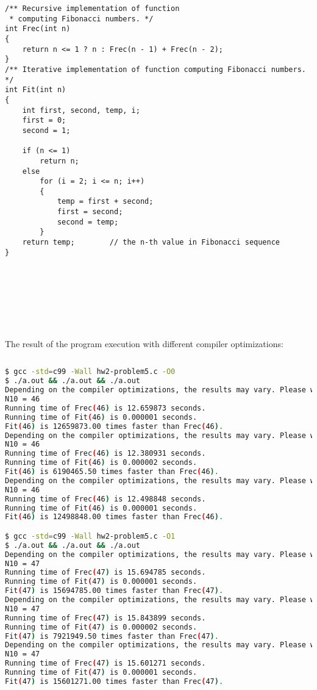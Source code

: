 \documentclass{article}
\begin{document}
\begin{verbatim}
/** Recursive implementation of function
 * computing Fibonacci numbers. */
int Frec(int n)
{
    return n <= 1 ? n : Frec(n - 1) + Frec(n - 2);
}
/** Iterative implementation of function computing Fibonacci numbers. */
int Fit(int n)
{
    int first, second, temp, i;
    first = 0;
    second = 1;

    if (n <= 1)
        return n;
    else
        for (i = 2; i <= n; i++)
        {
            temp = first + second;
            first = second;
            second = temp;
        }
    return temp;        // the n-th value in Fibonacci sequence
}
		\end{verbatim}
		
		
\paragraph{}\
\paragraph{}\
\paragraph{}\

	\rmfamily
	\noindent The result of the program execution with different compiler optimizations:
	
	\ttfamily
	\begin{lstlisting}[language=bash]
	
$ gcc -std=c99 -Wall hw2-problem5.c -O0
$ ./a.out && ./a.out && ./a.out
Depending on the compiler optimizations, the results may vary. Please wait...
N10 = 46
Running time of Frec(46) is 12.659873 seconds.
Running time of Fit(46) is 0.000001 seconds.
Fit(46) is 12659873.00 times faster than Frec(46).
Depending on the compiler optimizations, the results may vary. Please wait...
N10 = 46
Running time of Frec(46) is 12.380931 seconds.
Running time of Fit(46) is 0.000002 seconds.
Fit(46) is 6190465.50 times faster than Frec(46).
Depending on the compiler optimizations, the results may vary. Please wait...
N10 = 46
Running time of Frec(46) is 12.498848 seconds.
Running time of Fit(46) is 0.000001 seconds.
Fit(46) is 12498848.00 times faster than Frec(46).

$ gcc -std=c99 -Wall hw2-problem5.c -O1
$ ./a.out && ./a.out && ./a.out
Depending on the compiler optimizations, the results may vary. Please wait...
N10 = 47
Running time of Frec(47) is 15.694785 seconds.
Running time of Fit(47) is 0.000001 seconds.
Fit(47) is 15694785.00 times faster than Frec(47).
Depending on the compiler optimizations, the results may vary. Please wait...
N10 = 47
Running time of Frec(47) is 15.843899 seconds.
Running time of Fit(47) is 0.000002 seconds.
Fit(47) is 7921949.50 times faster than Frec(47).
Depending on the compiler optimizations, the results may vary. Please wait...
N10 = 47
Running time of Frec(47) is 15.601271 seconds.
Running time of Fit(47) is 0.000001 seconds.
Fit(47) is 15601271.00 times faster than Frec(47).
	\end{lstlisting}
	
	
		
\end{document}
